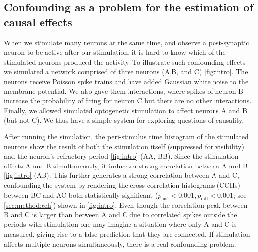 \documentclass[11pt]{article}
\begin{document}
\subsection{Confounding as a problem for the estimation of causal effects}
When we stimulate many neurons at the same time, and observe a post-synaptic neuron to be active after our stimulation, it is hard to know which of the stimulated neurons produced the activity. To illustrate such confounding effects we simulated a network comprised of three neurons (A,B, and C) \cref{fig:intro}. The neurons receive Poisson spike trains and have added Gaussian white noise to the membrane potential. We also gave them interactions, where spikes of neuron B increase the probability of firing for neuron C but there are no other interactions.
Finally, we allowed simulated optogenetic stimulation to affect neurons A and B (but not C). We thus have a simple system for exploring questions of causality.

After running the simulation, the peri-stimulus time histogram of the stimulated neurons show the result of both the stimulation itself (suppressed for visibility) and the neuron's refractory period \cref{fig:intro} (AA, BB).  Since the stimulation affects A and B simultaneously, it induces a strong correlation between A and B \cref{fig:intro} (AB). This further generates a strong correlation between A and C, confounding the system by rendering the cross correlation histograms (CCHs) between BC and AC both statistically significant ($ p_{\mathrm{fast}} < 0.001, p_{\mathrm{diff}} < 0.001 $; see \cref{sec:method:cch}) shown in \cref{fig:intro}. Even though the correlation peak between B and C is larger than between A and C due to correlated spikes outside the periods with stimulation one may imagine a situation where only A and C is measured, giving rise to a false prediction that they are connected. If stimulation affects multiple neurons simultaneously, there is a real confounding problem.
\end{document}
